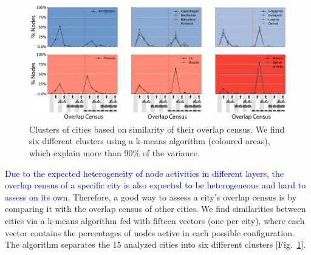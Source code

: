 \begin{figure}[t!]
	\centering
	\includegraphics[width=\textwidth]{images/multiplex/ResultsOverlapCensus-01.png}
	\caption[Overlap Census clusters]{
		Clusters of cities based on similarity of their overlap census. We find six different clusters using a k-means algorithm (coloured areas), which explain more than $90\%$ of the variance.
		}
	\label{fig:ResultsOverlapCensus}
\end{figure}

\textcolor{blue}{Due to the expected heterogeneity of node activities in different layers, the overlap census of a specific city is also expected to be heterogeneous and hard to assess on its own.} Therefore, a good way to assess a city's overlap census is by comparing it with the overlap census of other cities. We find similarities between cities via a k-means algorithm fed with fifteen vectors (one per city), where each vector contains the percentages of nodes active in each possible configuration. The algorithm separates the 15 analyzed cities into six different clusters [Fig.~\ref{fig:ResultsOverlapCensus}].

